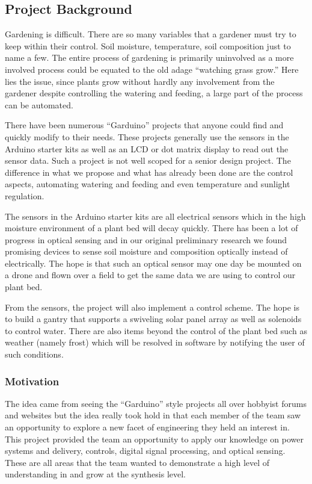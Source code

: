 \subsection{Project Background}
Gardening is difficult. There are so many variables that a gardener must try to keep within their control. Soil moisture, temperature, soil composition just to name a few. The entire process of gardening is primarily uninvolved as a more involved process could be equated to the old adage ``watching grass grow.'' Here lies the issue, since plants grow without hardly any involvement from the gardener despite controlling the watering and feeding, a large part of the process can be automated.

There have been numerous ``Garduino'' projects that anyone could find and quickly modify to their needs. These projects generally use the sensors in the Arduino starter kits as well as an LCD or dot matrix display to read out the sensor data. Such a project is not well scoped for a senior design project. The difference in what we propose and what has already been done are the control aspects, automating watering and feeding and even temperature and sunlight regulation.

The sensors in the Arduino starter kits are all electrical sensors which in the high moisture environment of a plant bed will decay quickly. There has been a lot of progress in optical sensing and in our original preliminary research we found promising devices to sense soil moisture and composition optically instead of electrically. The hope is that such an optical sensor may one day be mounted on a drone and flown over a field to get the same data we are using to control our plant bed.

From the sensors, the project will also implement a control scheme. The hope is to build a gantry that supports a swiveling solar panel array as well as solenoids to control water. There are also items beyond the control of the plant bed such as weather (namely frost) which will be resolved in software by notifying the user of such conditions.
\subsubsection{Motivation}
The idea came from seeing the ``Garduino'' style projects all over hobbyist forums and websites but the idea really took hold in that each member of the team saw an opportunity to explore a new facet of engineering they held an interest in. This project provided the team an opportunity to apply our knowledge on power systems and delivery, controls, digital signal processing, and optical sensing. These are all areas that the team wanted to demonstrate a high level of understanding in and grow at the synthesis level.